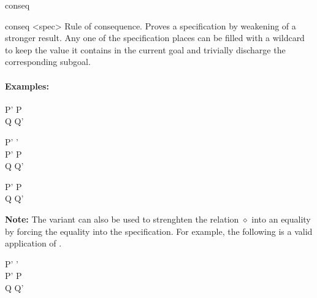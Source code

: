 \begin{tactic}{conseq}
  \begin{tsyntax}{conseq <spec>}
  Rule of consequence. Proves a specification by weakening of a
  stronger result. Any one of the specification places can be filled
  with a wildcard \ec{_} to keep the value it contains in the current
  goal and trivially discharge the corresponding subgoal.

  \paragraph{Examples:}\strut
  
  \begin{cmathpar}
    {P' \Rightarrow P \\ Q \Rightarrow Q' \\ }
    {}

    {P' \Rightarrow \delta \mathrel{\diamond} \delta' \\
     P' \Rightarrow P \\
     Q \mathrel{\diamond^\uparrow} Q' \\
     }
    {}

    {P' \Rightarrow P \\ Q \Rightarrow Q' \\ }
    {}
  \end{cmathpar}

  \textbf{Note:} The \phl variant can also be used to strenghten the
  relation $\diamond$ into an equality by forcing the equality into
  the specification. For example, the following is a valid application
  of .

  \begin{cmathpar}
    {P' \Rightarrow \delta \mathrel{=} \delta' \\
     P' \Rightarrow P \\
     Q \mathrel{\Leftrightarrow} Q' \
     }
    {}
  \end{cmathpar}  
  \end{tsyntax}


\end{tactic}
